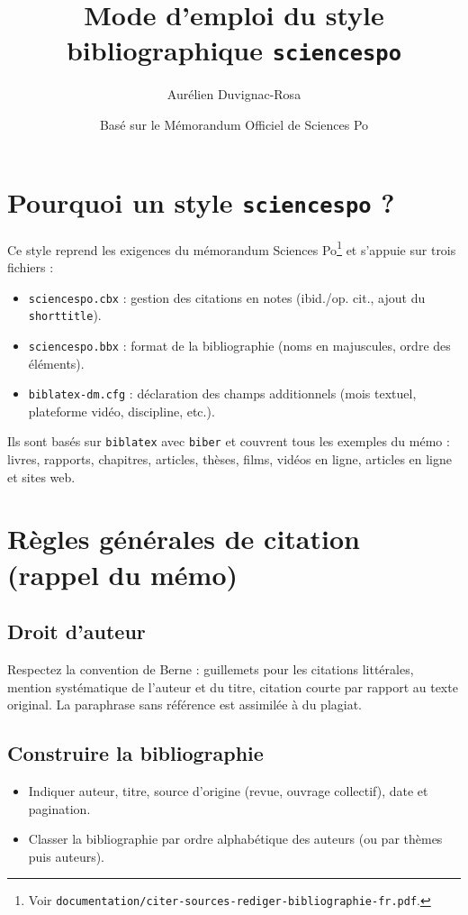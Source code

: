 \documentclass{article}
\title{Mode d'emploi du style bibliographique \texttt{sciencespo}}
\author{Aurélien Duvignac-Rosa}
\date{Basé sur le Mémorandum Officiel de Sciences Po}
\begin{document}
\maketitle
\tableofcontents

\section{Pourquoi un style \texttt{sciencespo} ?}

Ce style reprend les exigences du mémorandum Sciences Po\footnote{Voir \texttt{documentation/citer-sources-rediger-bibliographie-fr.pdf}.} et s'appuie sur trois fichiers :
\begin{itemize}
	\item \texttt{sciencespo.cbx} : gestion des citations en notes (ibid./op. cit., ajout du \texttt{shorttitle}).
	\item \texttt{sciencespo.bbx} : format de la bibliographie (noms en majuscules, ordre des éléments).
	\item \texttt{biblatex-dm.cfg} : déclaration des champs additionnels (mois textuel, plateforme vidéo, discipline, etc.).
\end{itemize}
Ils sont basés sur \texttt{biblatex} avec \texttt{biber} et couvrent tous les exemples du mémo : livres, rapports, chapitres, articles, thèses, films, vidéos en ligne, articles en ligne et sites web.

\section{Règles générales de citation (rappel du mémo)}

\subsection{Droit d'auteur}
Respectez la convention de Berne : guillemets pour les citations littérales, mention systématique de l'auteur et du titre, citation courte par rapport au texte original. La paraphrase sans référence est assimilée à du plagiat.

\subsection{Construire la bibliographie}
\begin{itemize}
	\item Indiquer auteur, titre, source d'origine (revue, ouvrage collectif), date et pagination.
	\item Classer la bibliographie par ordre alphabétique des auteurs (ou par thèmes puis auteurs).
\end{itemize}
\end{document}
